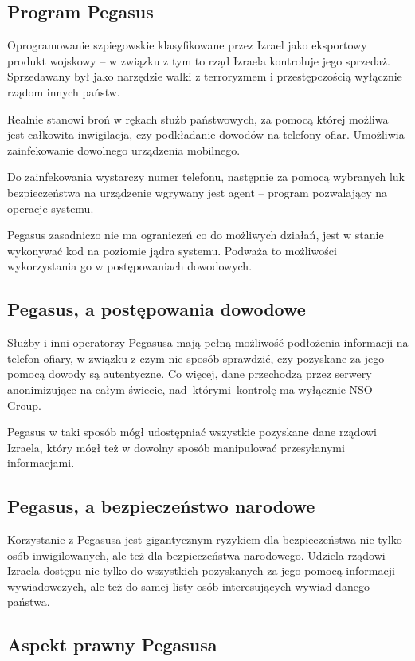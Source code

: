 \documentclass{article}
\begin{document}
\subsection{Program Pegasus}

Oprogramowanie szpiegowskie klasyfikowane przez Izrael jako eksportowy produkt wojskowy -- w związku z tym to rząd Izraela kontroluje jego sprzedaż. Sprzedawany był jako narzędzie walki z terroryzmem i przestępczością wyłącznie rządom innych państw.

Realnie stanowi broń w rękach służb państwowych, za pomocą której możliwa jest całkowita inwigilacja, czy podkładanie dowodów na telefony ofiar.
Umożliwia zainfekowanie dowolnego urządzenia mobilnego.

Do zainfekowania wystarczy numer telefonu, następnie za pomocą wybranych luk bezpieczeństwa na urządzenie wgrywany jest agent -- program pozwalający na operacje systemu.

Pegasus zasadniczo nie ma ograniczeń co do możliwych działań, jest w stanie wykonywać kod na poziomie jądra systemu. Podważa to możliwości wykorzystania go w postępowaniach dowodowych.

\subsection{Pegasus, a postępowania dowodowe}

Służby i inni operatorzy Pegasusa mają pełną możliwość podłożenia informacji na telefon ofiary, w związku z czym nie sposób sprawdzić, czy pozyskane za jego pomocą dowody są autentyczne. Co więcej, dane przechodzą przez serwery anonimizujące na całym świecie, nad~którymi~kontrolę ma wyłącznie NSO Group.

Pegasus w taki sposób mógł udostępniać wszystkie pozyskane dane rządowi Izraela, który mógł też w dowolny sposób manipulować przesyłanymi informacjami.

\subsection{Pegasus, a bezpieczeństwo narodowe}

Korzystanie z Pegasusa jest gigantycznym ryzykiem dla bezpieczeństwa nie tylko osób inwigilowanych, ale też dla bezpieczeństwa narodowego. Udziela rządowi Izraela dostępu nie tylko do wszystkich pozyskanych za jego pomocą informacji wywiadowczych, ale też do samej listy osób interesujących wywiad danego państwa.

\subsection{Aspekt prawny Pegasusa}
\end{document}
